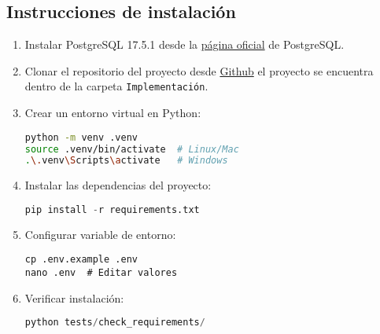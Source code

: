 	\subsection{Instrucciones de instalaci\'on}
	\begin{enumerate}
		\item Instalar PostgreSQL 17.5.1 desde la \href{https://www.postgresql.org/download/}{p\'agina oficial} de PostgreSQL.
		\item Clonar el repositorio del proyecto desde \href{https://github.com/Ic3manMtz/Servicio-Social.git}{Github} el proyecto se encuentra dentro de la carpeta \texttt{Implementaci\'on}.
		\item Crear un entorno virtual en Python:
		\begin{lstlisting}[language=bash]
python -m venv .venv
source .venv/bin/activate  # Linux/Mac
.\.venv\Scripts\activate   # Windows
		\end{lstlisting}
		\item Instalar las dependencias del proyecto:
		\begin{lstlisting}[language=python]
pip install -r requirements.txt
		\end{lstlisting}
		\item Configurar variable de entorno:
		\begin{lstlisting}
cp .env.example .env
nano .env  # Editar valores
		\end{lstlisting}
		\item Verificar instalaci\'on:
		\begin{lstlisting}[language=python]
python tests/check_requirements/
		\end{lstlisting}
	\end{enumerate}

